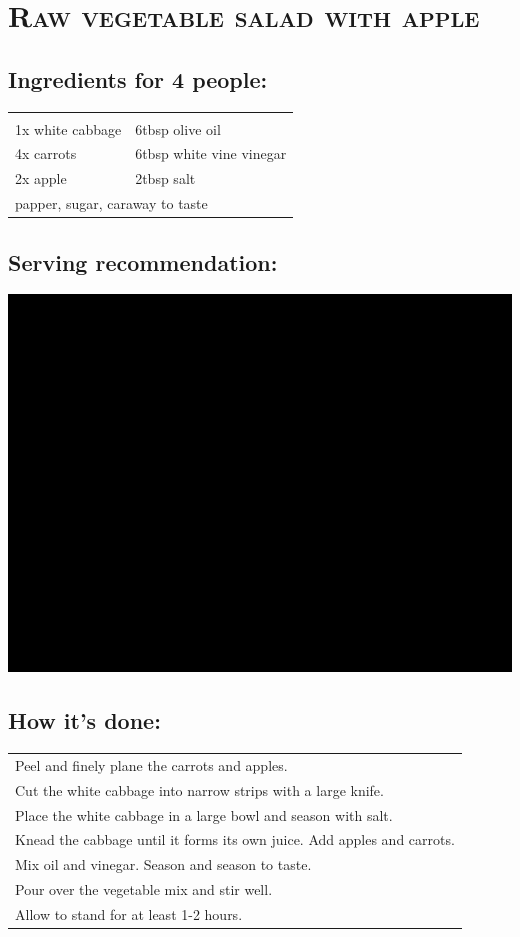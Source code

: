 \section{\textsc{Raw vegetable salad with apple}}

\subsection*{Ingredients for 4 people:}

\begin{tabular}{p{7.5cm} p{7.5cm}}
	& \\
	1x white cabbage & 6tbsp olive oil \\
	4x carrots & 6tbsp white vine vinegar \\
	2x apple & 2tbsp salt \\
	\multicolumn{2}{l}{papper, sugar, caraway to taste}
\end{tabular}

\subsection*{Serving recommendation:}

\includegraphics[width=\textwidth]{img/ph.jpg} \cite{rohkostapfel}

\subsection*{How it's done:}

\begin{tabular}{p{15cm}}
	\\
  Peel and finely plane the carrots and apples.\\
  Cut the white cabbage into narrow strips with a large knife.\\
  Place the white cabbage in a large bowl and season with salt.\\
  Knead the cabbage until it forms its own juice. Add apples and carrots.\\
  Mix oil and vinegar. Season and season to taste.\\
  Pour over the vegetable mix and stir well.\\
  Allow to stand for at least 1-2 hours.
\end{tabular}
